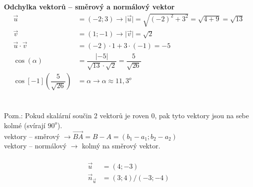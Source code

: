 \documentclass{article}
\begin{document}
	{\Large \textbf{Odchylka vektorů -- směrový a normálový vektor}}
	\begin{align*}
		\vec{u}&=(-2;3) \rightarrow \lvert\vec{u}\rvert=\sqrt{(-2)^2+3^2}=\sqrt{4+9}=\sqrt{13}\\
		\vec{v}&=(1;-1) \rightarrow \lvert\vec{v}\rvert=\sqrt{2}\\
		\vec{u}\cdot\vec{v}&=(-2)\cdot 1+3\cdot (-1)=-5\\
		\cos(\alpha)&=\dfrac{\lvert-5\rvert}{\sqrt{13}\cdot\sqrt{2}}=\dfrac{5}{\sqrt{26}}\\
		\cos[-1]({\dfrac{5}{\sqrt{26}}})&=\alpha \rightarrow \alpha\approx 11,3^o
	\end{align*}\\
	\vspace{1em}\\
	Pozn.: Pokud skalární součin 2 vektorů je roven 0,
	pak tyto vektory jsou na sebe kolmé (svírají $90^o$).\\
	vektory -- směrový $\rightarrow \vec{BA}=B-A=(b_1-a_1;b_2-a_2)$\\
	vektory -- normálový $\rightarrow$ kolmý na směrový vektor.\\
	\vspace{1em}\\
	\begin{align*}
		\vec{u}&=(4;-3)\\
		\vec{n}_{\vec{u}}&=(3;4)/(-3;-4)
	\end{align*}
\end{document}
